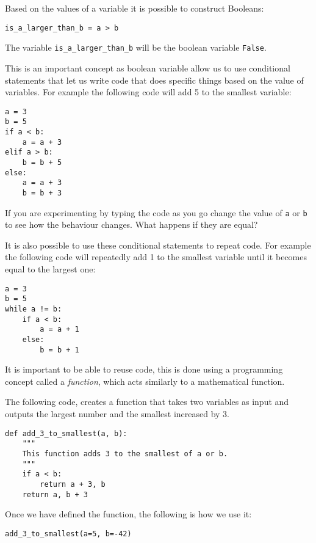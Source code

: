 Based on the values of a variable it is possible to construct Booleans:

\begin{verbatim}
is_a_larger_than_b = a > b
\end{verbatim}

The variable \texttt{is_a_larger_than_b} will be the boolean variable
\texttt{False}.

This is an important concept as boolean variable allow us to use conditional
statements that let us write code that does specific things based on the value
of variables. For example the following code will add 5 to the smallest
variable:

\begin{verbatim}
a = 3
b = 5
if a < b:
    a = a + 3
elif a > b:
    b = b + 5
else:
    a = a + 3
    b = b + 3
\end{verbatim}

If you are experimenting by typing the code as you go change the value of
\texttt{a} or \texttt{b} to see how the behaviour changes.
What happens if they are equal?

It is also possible to use these conditional statements to repeat code. For
example the following code will repeatedly add 1 to the smallest variable until
it becomes equal to the largest one:

\begin{verbatim}
a = 3
b = 5
while a != b:
    if a < b:
        a = a + 1
    else:
        b = b + 1
\end{verbatim}

It is important to be able to reuse code, this is done using a programming
concept called a \textit{function}, which acts similarly to a mathematical
function.

The following code, creates a function that takes two variables as input and
outputs the largest number and the smallest increased by 3.

\begin{verbatim}
def add_3_to_smallest(a, b):
    """ 
    This function adds 3 to the smallest of a or b.
    """
    if a < b:
        return a + 3, b
    return a, b + 3
\end{verbatim}

Once we have defined the function, the following is how we use it:

\begin{verbatim}
add_3_to_smallest(a=5, b=-42)
\end{verbatim}

